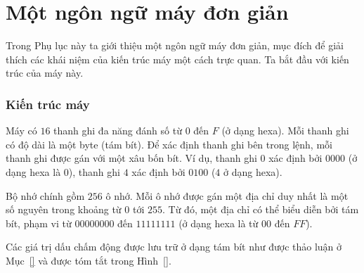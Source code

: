 
\chapter {Một ngôn ngữ máy đơn giản}
\label{phuluc1}

Trong Phụ lục này ta giới thiệu một ngôn ngữ máy đơn giản, mục
đích để giải thích các khái niệm của kiến trúc máy một cách trực
quan. Ta bắt đầu với kiến trúc của máy này.

\subsection*{Kiến trúc máy}
Máy có $16$ thanh ghi đa năng đánh số từ $0$ đến $F$ (ở dạng
hexa). Mỗi thanh ghi có độ dài là một byte (tám bít). Để xác định
thanh ghi bên trong lệnh, mỗi thanh ghi được gán với một xâu bốn
bít. Ví dụ, thanh ghi $0$ xác định bởi $0000$ (ở dạng hexa là $0$),
thanh ghi $4$ xác định bởi $0100$ ($4$ ở dạng hexa).

Bộ nhớ chính gồm $256$ ô nhớ. Mỗi ô nhớ được gán một địa chỉ duy nhất
là một số nguyên trong khoảng từ $0$ tới $255$. Từ đó, một địa chỉ có
thể biểu diễn bởi tám bít, phạm vi từ $00000000$ đến $11111111$ (ở
dạng hexa là từ $00$ đến $FF$).

Các giá trị dấu chấm động được lưu trữ ở dạng tám bít như được thảo
luận ở Mục~\ref{} và được tóm tắt trong Hình~\ref{}.

